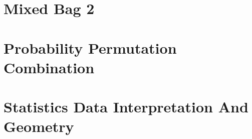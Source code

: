 \documentclass[12pt,a4paper,openany]{book}
\newcounter{totalcounter}
\newcommand{\newsection}[1]{%
  \clearpage %
  \section{#1}
  \vspace{-0.5em} %
}
\begin{document}




\setcounter{totalcounter}{1}

\newsection{Mixed Bag 2}





\setcounter{totalcounter}{1}

\newsection{Probability Permutation Combination}





\setcounter{totalcounter}{1}

\newsection{Statistics Data Interpretation And Geometry}




\end{document}
